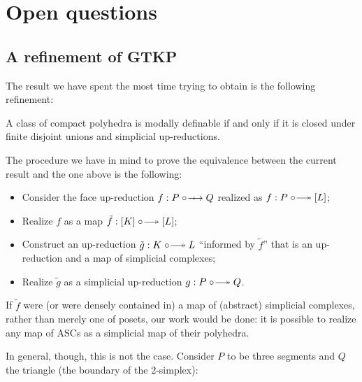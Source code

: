 \section{Open questions}
\subsection{A refinement of GTKP}
The result we have spent the most time trying to obtain is the following refinement:
\begin{conjecture}
    A class of compact polyhedra is modally definable if and only if
    it is closed under finite disjoint unions and simplicial up-reductions.
\end{conjecture}

The procedure we have in mind to prove the equivalence between the current result
and the one above is the following:
\begin{itemize}
    \item Consider the face up-reduction $f:P\fupred Q$ realized as $f:P\upred [L]$;
    \item Realize $f$ as a map $\tilde{f}:[K]\upred [L]$;
    \item Construct an up-reduction $\tilde{g}:K\upred L$ ``informed by $\tilde{f}$''
    that is an up-reduction and a map of simplicial complexes;
    \item Realize $\tilde{g}$ as a simplicial up-reduction $g:P\upred Q$.
\end{itemize}
If $\tilde{f}$ were (or were densely contained in) a map of (abstract) simplicial complexes, rather than merely one of posets, our work would be done: it is possible to realize any map of ASCs as a simplicial map of their polyhedra.

In general, though, this is not the case. Consider $P$ to be three segments and $Q$ the triangle (the boundary of the $2$-simplex):

